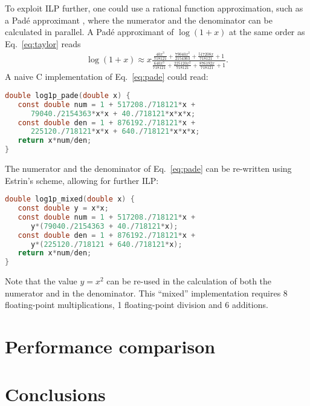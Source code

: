 \documentclass[10pt,DIV16,twocolumn]{scrartcl}
\begin{document}
To exploit ILP further, one could use a rational function
approximation, such as a Padé approximant \cite{pade}, where the
numerator and the denominator can be calculated in parallel.  A Padé
approximant of $\log(1+x)$ at the same order as Eq.~\eqref{eq:taylor}
reads
%
\begin{align}
  \log(1+x) \approx x
  \frac{\frac{40 x^3}{718121}+\frac{79040 x^2}{2154363}+\frac{517208
    x}{718121}+1}{\frac{640 x^3}{718121}+\frac{225120 x^2}{718121}+\frac{876192
    x}{718121}+1}.
  \label{eq:pade}
\end{align}
%
A naive C implementation of Eq.~\eqref{eq:pade} could read:
%
\begin{lstlisting}[language=C]
double log1p_pade(double x) {
   const double num = 1 + 517208./718121*x +
      79040./2154363*x*x + 40./718121*x*x*x;
   const double den = 1 + 876192./718121*x +
      225120./718121*x*x + 640./718121*x*x*x;
   return x*num/den;
}
\end{lstlisting}
%
The numerator and the denominator of Eq.~\eqref{eq:pade} can be
re-written using Estrin's scheme, allowing for further ILP:
%
\begin{lstlisting}[language=C]
double log1p_mixed(double x) {
   const double y = x*x;
   const double num = 1 + 517208./718121*x +
      y*(79040./2154363 + 40./718121*x);
   const double den = 1 + 876192./718121*x +
      y*(225120./718121 + 640./718121*x);
   return x*num/den;
}
\end{lstlisting}
%
Note that the value $y=x^2$ can be re-used in the calculation of both
the numerator and in the denominator.  This ``mixed'' implementation
requires 8 floating-point multiplications, 1 floating-point division
and 6 additions.

\section{Performance comparison}

\section{Conclusions}



\end{document}
